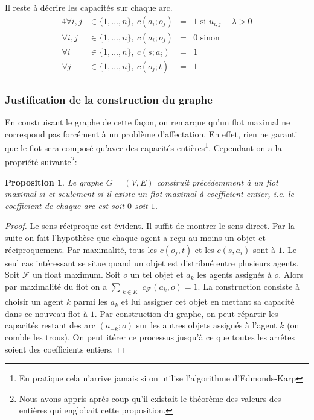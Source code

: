 \documentclass[a4paper, titlepage, oneside, 12pt]{article}%
\newtheorem{prop}{Proposition}
\begin{document}
Il reste à décrire les capacités sur chaque arc. 
\begin{alignat*}{4}
\forall i,j &\in \{1, \dots, n\},\ c(a_i;o_j)&=&1  \mbox{ si } u_{i,j}-\lambda>0\\
\forall i,j &\in \{1, \dots, n\},\ c(a_i;o_j)&=&0  \mbox{ sinon}\\
\forall i &\in \{1, \dots, n\},\ c(s;a_i)&=&1\\
\forall j &\in \{1, \dots, n\},\ c(o_j;t)&=&1\\
\end{alignat*}

\subsubsection{Justification de la construction du graphe}

En construisant le graphe de cette façon, on remarque qu'un flot maximal ne correspond pas forcément à un problème d'affectation. En effet, rien ne garanti que le flot sera composé qu'avec des capacités entières\footnote{En pratique cela n'arrive jamais si on utilise l'algorithme d'Edmonds-Karp}. Cependant on a la propriété suivante\footnote{Nous avons appris après coup qu'il existait le théorème des valeurs des entières qui englobait cette proposition.}:

\begin{prop}
Le graphe $G=(V,E)$ construit précédemment à un flot maximal si et seulement si il existe un flot maximal à coefficient entier, i.e. le coefficient de chaque arc est soit $0$ soit $1$. 
\label{prop1}
\end{prop}

\begin{proof}
Le sens réciproque est évident. Il suffit de montrer le sens direct. Par la suite on fait l'hypothèse que chaque agent a reçu au moins un objet et réciproquement. Par maximalité, tous les $c(o_j,t)$ et les $c(s,a_i)$ sont à $1$. Le seul cas intéressant se situe quand un objet est distribué entre plusieurs agents. Soit $\mathcal{F}$ un float maximum. Soit $o$ un tel objet et $a_k$ les agents assignés à $o$. Alors par maximalité du flot on a $\sum_{\substack{k\in K}} c_{\mathcal{F}}(a_k,o)=1$. La construction consiste à choisir un agent $k$ parmi les $a_k$ et lui assigner cet objet en mettant sa capacité dans ce nouveau flot à $1$. Par construction du graphe, on peut répartir les capacités restant des arc $(a_{-k}; o)$ sur les autres objets assignés à l'agent $k$ (on comble les trous). On peut itérer ce processus jusqu'à ce que toutes les arrêtes soient des coefficients entiers.
\end{proof}
\end{document}
